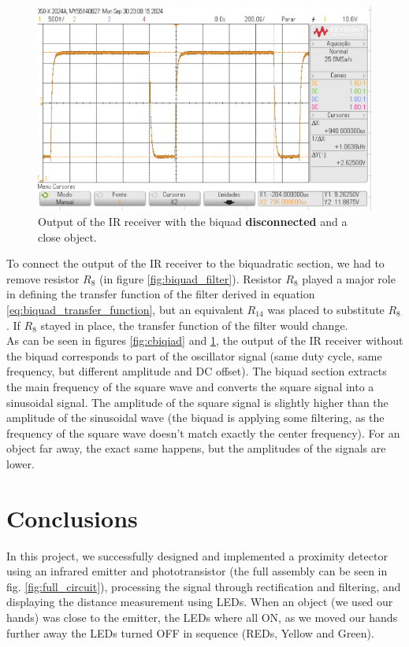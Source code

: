 \documentclass[lettersize,journal]{IEEEtran}
\begin{document}
\begin{figure}[H]
    \centering
    \includegraphics[width=0.9\linewidth]{images/cbiquadprox.png}
    \caption{Output of the IR receiver with the biquad \textbf{disconnected} and a close object.}
    \label{fig:sbiquad}
\end{figure}

To connect the output of the IR receiver to the biquadratic section, we had to remove resistor $R_8$ (in figure \ref{fig:biquad_filter}). Resistor $R_8$ played a major role in defining the transfer function of the filter derived in equation \ref{eq:biquad_transfer_function}, but an equivalent $R_{14}$ was placed to substitute $R_8$. If $R_8$ stayed in place, the transfer function of the filter would change.\\

As can be seen in figures \ref{fig:cbiqiad} and \ref{fig:sbiquad}, the output of the IR receiver without the biquad corresponds to part of the oscillator signal (same duty cycle, same frequency, but different amplitude and DC offset). The biquad section extracts the main frequency of the square wave and converts the square signal into a sinusoidal signal. The amplitude of the square signal is slightly higher than the amplitude of the sinusoidal wave (the biquad is applying some filtering, as the frequency of the square wave doesn't match exactly the center frequency). For an object far away, the exact same happens, but the amplitudes of the signals are lower.
 
\section{Conclusions}

In this project, we successfully designed and implemented a proximity detector using an infrared emitter and phototransistor (the full assembly can be seen in fig. \ref{fig:full_circuit}), processing the signal through rectification and filtering, and displaying the distance measurement using LEDs. When an object (we used our hands) was close to the emitter, the LEDs where all ON, as we moved our hands further away the LEDs turned OFF in sequence (REDs, Yellow and Green).\\ 
\end{document}
